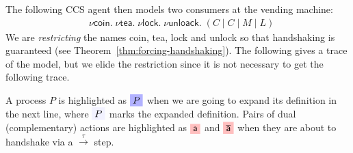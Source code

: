 \documentclass{article}
\def\mystrut{\rule{0pt}{0.68em}}
\newcommand{\act}[1]{\textsf{#1}}
\newcommand{\da}[1]{\overline{\mystrut\textsf{#1}}}
\newcommand{\dak}[1]{\overline{\textsf{#1}}}
\newcommand{\highlightG}[1]{%
  \colorbox{blue!30}{$\displaystyle#1$}}
\newcommand{\highlightR}[1]{%
  \colorbox{red!25}{$\displaystyle#1$}}
\newcommand{\highlightGH}[1]{%
  \colorbox{blue!5}{$\displaystyle#1$}}
\theoremstyle{definition}
\newcommand{\src}[1]{\highlightR{#1}}
\newcommand{\srch}[1]{\highlightG{#1}}
\newcommand{\trgh}[1]{\highlightGH{#1}}
\newcommand{\restr}[2]{\nu #2 . #1}
\begin{document}
\noindent
The following CCS agent then models two consumers at the vending machine:
%
\begin{align*}
  & \nu \act{coin} . \; \nu \act{tea} . \; \nu \act{lock} . \;
\nu \act{unloack} . \; {({C} \mid C \mid {M} \mid L)}
\end{align*}
We are \emph{restricting} the names \act{coin}, \act{tea},
\act{lock} and \act{unlock} so that handshaking is guaranteed
(see Theorem~\ref{thm:forcing-handshaking}).
The following gives a trace of the model, but we elide the restriction
since it is not necessary to get the following trace.

\renewcommand{\restr}[2]{#1}

\iffalse
\newcommand{\asrch}[1]{#1}
\newcommand{\atrgh}[1]{#1}
\newcommand{\asrc}[1]{#1}

\begin{align*}
 \restr{\asrch{C} \mid C \mid \asrch{M}}{\actions{}} \;\;
\equiv \;\;
 \restr{\asrch{C} \mid C \mid V \mid V \mid \asrch{M}}{\actions{}} \;\;
\equiv \;\; & \restr{\atrgh{\asrc{\da{coin}}.\act{tea}.C} \mid \asrc{\da{coin}}.\act{tea}.C \mid \atrgh{\asrc{\act{coin}}.A.\da{tea} \mid \asrc{\act{coin}}.A.\da{tea} \mid M}}{\actions{}} \\
\xrightarrow{\tau} \;\; & \restr{\act{tea}.C \mid \asrc{\da{coin}}.\act{tea}.C \mid A.\da{tea} \mid \asrc{\act{coin}}.A.\da{tea} \mid \asrch{M}}{\actions{}}  \\
\xrightarrow{\tau} \;\; &
 \restr{\act{tea}.C \mid {\act{tea}.C} \mid
A.\da{tea} \mid
A.\da{tea} \mid M}{\actions{}}
\end{align*}
\fi

A process $P$ is highlighted as $\srch{P}$ when we are going to expand
its definition in the next line, where $\trgh{P}$ marks the expanded
definition. Pairs of dual (complementary) actions are highlighted as $\src{\act{a}}$
and $\src{\dak{a}}$ when they are about to handshake via a
$\xrightarrow{\tau}$ step.
\end{document}
